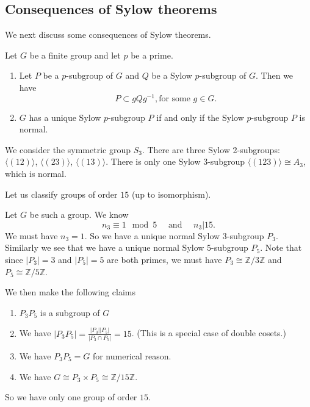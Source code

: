 \subsection{Consequences of Sylow theorems}
We next discuss some consequences of Sylow theorems.

\begin{cor}
    Let $G$ be a finite group and let $p$ be a prime.
    \begin{enumerate}
        \item Let $P$ be a $p$-subgroup of $G$ and $Q$ be a Sylow $p$-subgroup of $G$. Then we have
              \[
                  P \subset gQg^{-1}, \text{for some } g \in G.
              \]
        \item $G$ has a unique Sylow $p$-subgroup $P$ if and only if the Sylow $p$-subgroup $P$ is normal.
    \end{enumerate}
\end{cor}

\begin{example}
    We consider the symmetric group $S_3$. There are three Sylow 2-subgroups: $\langle (12) \rangle $, $\langle (23) \rangle $, $\langle (13) \rangle $. There is only one Sylow 3-subgroup $\langle (123) \rangle \cong A_3$, which is normal.

\end{example}
\begin{example}
    Let us classify groups of order $15$ (up to isomorphism).

    Let $G$ be such a group. We know
    \[
        n_3 \equiv 1 \mod 5 \quad \text{ and } \quad n_3 \vert 15.
    \]
    We must have $n_3 =1$. So we have a unique normal Sylow $3$-subgroup $P_3$. Similarly we see that we have a unique normal Sylow $5$-subgroup $P_5$. Note that since $|P_3| =3$ and $|P_5 | = 5$ are both primes, we must have $P_3 \cong \mathbb{Z}/ 3 \mathbb{Z}$ and $P_5 \cong \mathbb{Z}/ 5 \mathbb{Z}$.

    We then make the following claims
    \begin{enumerate}
        \item $P_3 P_5$ is a subgroup of $G$
        \item We have $|P_3 P_5| = \frac{|P_3| |P_5|}{ |P_3 \cap P_5|} = 15$. (This is a special case of double cosets.)
        \item We have $P_3 P_5 = G$ for numerical reason.
        \item We have $G \cong P_3 \times P_5 \cong \mathbb{Z}/ 15\mathbb{Z}$.
    \end{enumerate}

    So we have only one group of order $15$.
\end{example}




